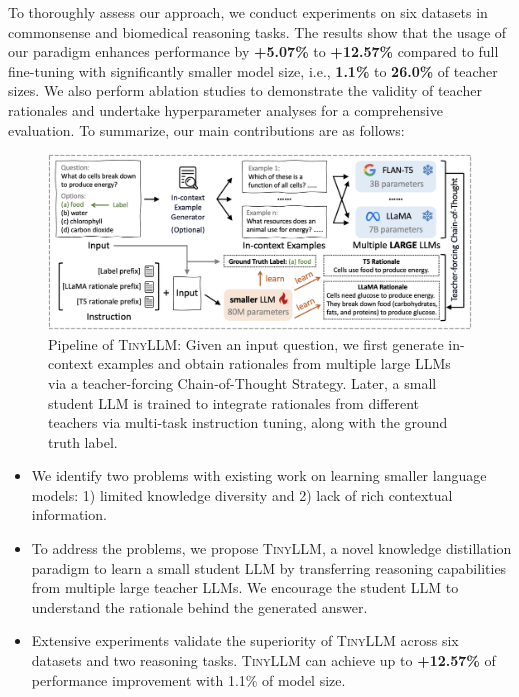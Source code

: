 \documentclass[sigconf,nonacm]{acmart}
\newcommand{\ours}{\textsc{TinyLLM}\xspace}
\begin{document}
To thoroughly assess our approach, we conduct experiments on six datasets in commonsense and biomedical reasoning tasks. The results show that the usage of our paradigm enhances performance by \textbf{+5.07\%} to \textbf{+12.57\%} compared to full fine-tuning with significantly smaller model size, i.e., \textbf{1.1\%} to \textbf{26.0\%} of teacher sizes. We also perform ablation studies to demonstrate the validity of teacher rationales and undertake hyperparameter analyses for a comprehensive evaluation. To summarize, our main contributions are as follows:


\begin{figure}[ht]
\begin{center}
\includegraphics[width=\textwidth]{Figures/pipeline.png}
\end{center}
\vspace{-0.1in}
\caption{
Pipeline of \ours: Given an input question, we first generate in-context examples and obtain rationales from multiple large LLMs via a teacher-forcing Chain-of-Thought Strategy. Later, a small student LLM is trained to integrate rationales from different teachers via multi-task instruction tuning, along with the ground truth label.
}
\label{fig:pipeline}
\vspace{-0.1in}
\end{figure}


\begin{itemize}[nosep,leftmargin=*]
\item We identify two problems with existing work on learning smaller language models: 1) limited knowledge diversity and 2) lack of rich contextual information.
\item To address the problems, we propose \ours, a novel knowledge distillation paradigm to learn a small student LLM by transferring reasoning capabilities from multiple large teacher LLMs. We encourage the student LLM to understand the rationale behind the generated answer.
\item Extensive experiments validate the superiority of \ours across six datasets and two reasoning tasks. 
\ours can achieve up to \textbf{+12.57\%} of performance improvement with 1.1\% of model size.
\end{itemize}
\end{document}

